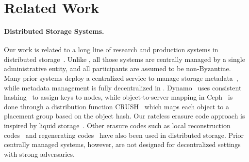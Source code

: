 \section{Related Work}
\label{sec:relwk}

\paragraph{Distributed Storage Systems.}
Our work is related to a long line of research and production systems in distributed storage~\cite{ceph,gfs,bigtable,dynamo,liquid,amazon_s3,amazon_glacier,google_storage,google_cloudstore,google_coldline,cidon2013copysets}.
Unlike \sys, all those systems are centrally managed by a single administrative entity, and all participants are assumed to be non-Byzantine.
Many prior systems deploy a centralized service to manage storage metadata~\cite{gfs,bigtable}, while metadata management is fully decentralized in \sys.
Dynamo~\cite{dynamo} uses consistent hashing~\cite{chash} to assign keys to nodes, while object-to-server mapping in Ceph~\cite{ceph} is done through a distribution function CRUSH~\cite{crush} which maps each object to a placement group based on the object hash.
Our rateless erasure code approach is inspired by liquid storage~\cite{liquid}.
Other erasure codes such as local reconstruction codes~\cite{lrcode} and regenerating codes~\cite{rcode} have also been used in distributed storage.
Prior centrally managed systems, however, are not designed for decentralized settings with strong adversaries.

